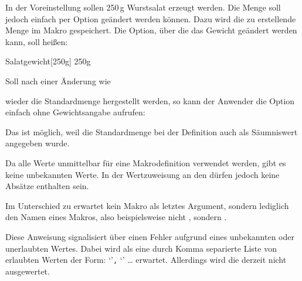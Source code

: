 \begin{Example}
  In der Voreinstellung sollen 250\,g Wurstsalat erzeugt werden. Die Menge
  soll jedoch einfach per Option geändert werden können. Dazu wird die zu
  erstellende Menge im Makro  gespeichert. Die Option,
  über die das Gewicht geändert werden kann, soll 
   heißen:
\begin{lstcode}
  \newcommand*{\Salatgewicht}{250g}
                  {Salatgewicht}[250g]%
                  {\Salatgewicht}
\end{lstcode}
  Soll nach einer Änderung
  \iftrue%
  wie
\begin{lstcode}
\end{lstcode}
  \fi%
  wieder die Standardmenge hergestellt
  werden, so kann der Anwender die Option einfach ohne Gewichtsangabe
  aufrufen:
\begin{lstcode}
\end{lstcode}
  Das ist möglich, weil die Standardmenge bei der Definition auch als
  Säumniswert angegeben wurde.
\end{Example}
Da alle Werte unmittelbar für eine Makrodefinition verwendet werden, gibt es
keine unbekannten Werte. In der Wertzuweisung an den  dürfen
jedoch keine Absätze enthalten sein.

Im Unterschied zu 
erwartet  kein Makro als letztes Argument, sondern
lediglich den Namen eines Makros, also beispielsweise nicht
, sondern .%
%
\EndIndexGroup


\begin{Declaration}
\end{Declaration}
Diese Anweisung signalisiert über 
einen Fehler aufgrund eines unbekannten oder unerlaubten Wertes. Dabei wird
als  eine durch Komma separierte Liste von erlaubten Werten
der Form:
    `'\texttt{,} `' \dots{}
erwartet. Allerdings wird die
 derzeit nicht ausgewertet.

